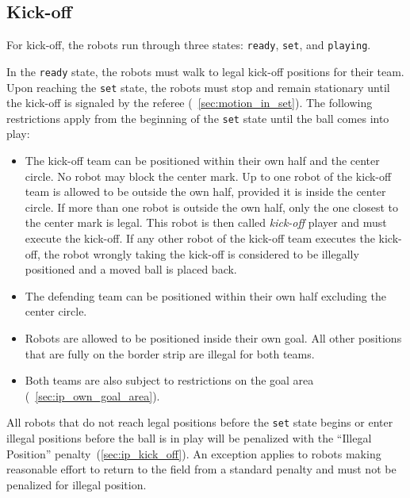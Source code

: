 
\subsection{Kick-off}
\label{sec:kick-off}

For kick-off, the robots run through three states: \texttt{ready}, \texttt{set}, and \texttt{playing}.

In the \texttt{ready} state, the robots must walk to legal kick-off positions for their team.
Upon reaching the \texttt{set} state, the robots must stop and remain stationary until the kick-off is signaled by the referee (\cf~\cref{sec:motion_in_set}).
The following restrictions apply from the beginning of the \texttt{set} state until the ball comes into play:
\begin{itemize}
  \item The kick-off team can be positioned within their own half and the center circle.
    No robot may block the center mark.
    Up to one robot of the kick-off team is allowed to be outside the own half, provided it is inside the center circle.
    If more than one robot is outside the own half, only the one closest to the center mark is legal.
    This robot is then called \emph{kick-off} player and must execute the kick-off.
    If any other robot of the kick-off team executes the kick-off, the robot wrongly taking the kick-off is considered to be illegally positioned and a moved ball is placed back.
  \item The defending team can be positioned within their own half excluding the center circle.
  \item Robots are allowed to be positioned inside their own goal.
    All other positions that are fully on the border strip are illegal for both teams.
  \item Both teams are also subject to restrictions on the goal area (\cf~\cref{sec:ip_own_goal_area}).
\end{itemize}
All robots that do not reach legal positions before the \texttt{set} state begins or enter illegal positions before the ball is in play will be penalized with the ``Illegal Position'' penalty~(\cf \cref{sec:ip_kick_off}).
An exception applies to robots making reasonable effort to return to the field from a standard penalty and must not be penalized for illegal position.


